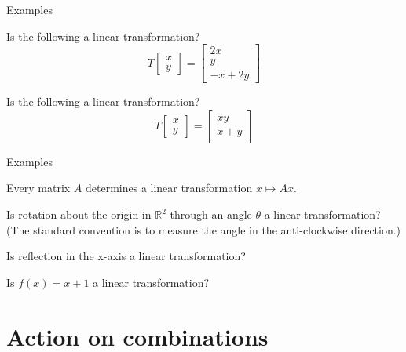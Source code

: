 \documentclass{beamer}
\begin{document}
\begin{frame}{Examples}
\begin{example}
Is the following a linear transformation?
\begin{equation*}
T \left[
\begin{array}{c}
x\\
y
\end{array}
\right] = \left[
\begin{array}{c}
2x\\
y\\
-x+2y
\end{array}
\right]
\end{equation*}
\end{example}
\begin{example}
Is the following a linear transformation?
\begin{equation*}
T \left[
\begin{array}{c}
x\\
y
\end{array}
\right] = \left[
\begin{array}{c}
xy\\
x+y
\end{array}
\right]
\end{equation*}
\end{example}
\end{frame}

\begin{frame}{Examples}
\begin{example}
Every matrix $A$ determines a linear transformation $x \mapsto Ax$.
\end{example}
\begin{example}
Is rotation about the origin in $\mathbb{R}^2$ through an angle $\theta$ a linear transformation?
(The standard convention is to measure the angle in the anti-clockwise direction.)
\end{example}
\begin{example}
Is reflection in the x-axis a linear transformation?
\end{example}
\begin{example}
Is $f(x) = x+1$ a linear transformation?
\end{example}
\end{frame}

\section{Action on combinations}
\end{document}
